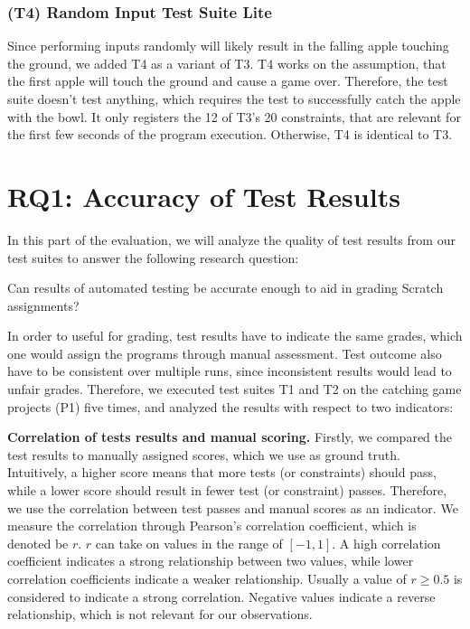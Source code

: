 \subsubsection{(T4) Random Input Test Suite Lite}

Since performing inputs randomly will likely result in the falling apple touching the ground,
we added T4 as a variant of T3.
T4 works on the assumption, that the first apple will touch the ground and cause a game over.
Therefore, the test suite doesn't test anything, which requires the test to successfully catch the apple with the bowl.
It only registers the 12 of T3's 20 constraints, that are relevant for the first few seconds of the program execution.
Otherwise, T4 is identical to T3.

\section{RQ1: Accuracy of Test Results}

In this part of the evaluation, we will analyze the quality of test results from our test suites to answer the following research question:

\begin{center}\begin{minipage}{.9\textwidth}
Can results of automated testing be accurate enough to aid in grading Scratch assignments?
\end{minipage}\end{center}

\noindent In order to useful for grading,
test results have to indicate the same grades,
which one would assign the programs through manual assessment.
Test outcome also have to be consistent over multiple runs,
since inconsistent results would lead to unfair grades.
Therefore, we executed test suites T1 and T2 on the catching game projects (P1) five times,
and analyzed the results with respect to two indicators:
\parspace

\textbf{Correlation of tests results and manual scoring.}
Firstly, we compared the test results to manually assigned scores, which we use as ground truth.
Intuitively, a higher score means that more tests (or constraints) should pass,
while a lower score should result in fewer test (or constraint) passes.
Therefore, we use the correlation between test passes and manual scores as an indicator.
We measure the correlation through Pearson's correlation coefficient, which is denoted be $r$.
$r$ can take on values in the range of $[-1, 1]$.
A high correlation coefficient indicates a strong relationship between two values,
while lower correlation coefficients indicate a weaker relationship.
Usually a value of $r \ge 0.5$ is considered to indicate a strong correlation.
Negative values indicate a reverse relationship, which is not relevant for our observations.
\parspace

